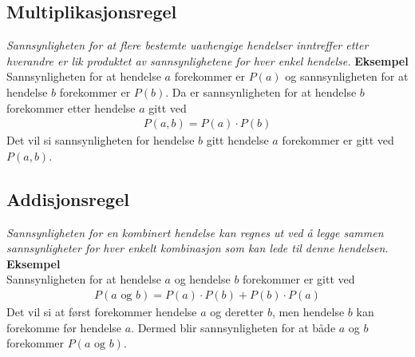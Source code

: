 \documentclass[main.tex]{subfiles}
\begin{document}
\subsection*{Multiplikasjonsregel}
\emph{Sannsynligheten for at flere bestemte uavhengige hendelser inntreffer etter hverandre er lik produktet av 
sannsynlighetene for hver enkel hendelse.}\newline\newline
\textbf{Eksempel}\\
Sannsynligheten for at hendelse $a$ forekommer er $P(a)$ og sannsynligheten for at hendelse $b$ forekommer er
$P(b)$. Da er sannsynligheten for at hendelse $b$ forekommer etter hendelse $a$ gitt ved
\begin{align*}
P(a,b) = P(a)\cdot P(b)
\end{align*}
Det vil si sannsynligheten for hendelse $b$ gitt hendelse $a$ forekommer er gitt ved $P(a,b)$.
\subsection*{Addisjonsregel}
\emph{Sannsynligheten for en kombinert hendelse kan regnes ut ved å legge sammen sannsynligheter for hver enkelt kombinasjon som kan lede til denne hendelsen.}\newline\newline
\textbf{Eksempel}\\
Sannsynligheten for at hendelse $a$ og hendelse $b$ forekommer er gitt ved
\begin{align*}
P(a \text{ og } b) = P(a)\cdot P(b) + P(b)\cdot P(a)
\end{align*}
Det vil si at først forekommer hendelse $a$ og deretter $b$, men hendelse $b$ kan forekomme før hendelse $a$.
Dermed blir sannsynligheten for at både $a$ og $b$ forekommer $P(a \text{ og } b)$.
\end{document}
